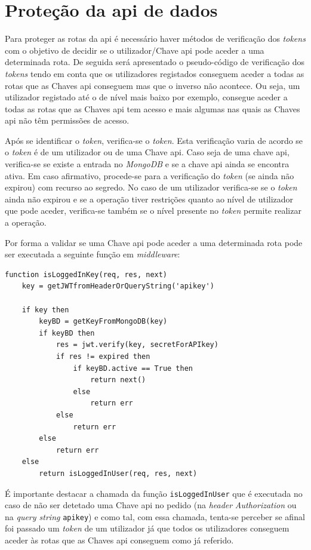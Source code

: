 \section{Proteção da \acrshort{api} de dados}

Para proteger as rotas da \acrshort{api} é necessário haver métodos de verificação dos \textit{tokens} com o objetivo de decidir se o utilizador/Chave \acrshort{api} pode aceder a uma determinada rota. De seguida será apresentado o pseudo-código de verificação dos \textit{tokens} tendo em conta que os utilizadores registados conseguem aceder a todas as rotas que as Chaves \acrshort{api} conseguem mas que o inverso não acontece. Ou seja, um utilizador registado até o de nível mais baixo por exemplo, consegue aceder a todas as rotas que as Chaves \acrshort{api} tem acesso e mais algumas nas quais as Chaves \acrshort{api} não têm permissões de acesso.

Após se identificar o \textit{token}, verifica-se o \textit{token}. Esta verificação varia de acordo se o \textit{token} é de um utilizador ou de uma Chave \acrshort{api}. Caso seja de uma chave \acrshort{api}, verifica-se se existe a entrada no \textit{MongoDB} e se a chave \acrshort{api} ainda se encontra ativa. Em caso afirmativo, procede-se para a verificação do \textit{token} (se ainda não expirou) com recurso ao segredo. No caso de um utilizador verifica-se se o \textit{token} ainda não expirou e se a operação tiver restrições quanto ao nível de utilizador que pode aceder, verifica-se também se o nível presente no \textit{token} permite realizar a operação.

Por forma a validar se uma Chave \acrshort{api} pode aceder a uma determinada rota pode ser executada a seguinte função em \textit{middleware}:
\begin{lstlisting}[language=pseudocode, caption=Verificação se um pedido com uma determinada Chave \acrshort{api} pode ser efetuado]
function isLoggedInKey(req, res, next)
    key = getJWTfromHeaderOrQueryString('apikey')

    if key then
        keyBD = getKeyFromMongoDB(key)
        if keyBD then
            res = jwt.verify(key, secretForAPIkey)
            if res != expired then
                if keyBD.active == True then
                    return next()
                else
                    return err
            else
                return err
        else
            return err
    else
        return isLoggedInUser(req, res, next)
\end{lstlisting}
É importante destacar a chamada da função \texttt{isLoggedInUser} que é executada no caso de não ser detetado uma Chave \acrshort{api} no pedido (na \textit{header} \textit{Authorization} ou na \textit{query string} \texttt{apikey}) e como tal, com essa chamada, tenta-se perceber se afinal foi passado um \textit{token} de um utilizador já que todos os utilizadores conseguem aceder às rotas que as Chaves \acrshort{api} conseguem como já referido.

